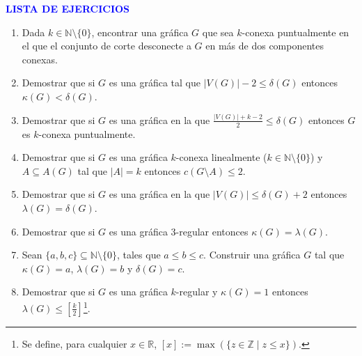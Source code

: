 \documentclass[10pt]{report}
\numberwithin{section}{chapter}
\newcommand{\N}{\mathbb N}
\newcommand{\Z}{\mathbb Z}
\newcommand{\R}{\mathbb R}
\begin{document}
\vspace{1cm}


\begin{center}
\textcolor{blue}{\textbf{\large LISTA DE EJERCICIOS}}
\end{center}


\begin{enumerate}
\item Dada $k \in \N \setminus \{0\}$, encontrar una gráfica $G$ que sea $k$-conexa puntualmente en el que el conjunto de corte desconecte a $G$ en más de dos componentes conexas.

\item Demostrar que si $G$ es una gráfica tal que $|V(G)|-2 \leq \delta(G)$ entonces $\kappa(G) < \delta(G)$.

\item Demostrar que si $G$ es una gráfica en la que $\frac{|V(G)|+k-2}{2} \leq \delta(G)$ entonces $G$ es $k$-conexa puntualmente.


\item Demostrar que si $G$ es una gráfica $k$-conexa linealmente ($k \in \N \setminus \{0\}$) y $A \subseteq A(G)$ tal que $|A| =k$ entonces $c(G\setminus A) \leq 2$.


\item Demostrar que si $G$ es una gráfica en la que $|V(G)| \leq \delta(G)+2$ entonces $\lambda(G) = \delta(G)$.


\item Demostrar que si $G$ es una gráfica $3$-regular entonces $\kappa(G) = \lambda(G)$.

\item Sean $\{a,b,c\} \subseteq \N \setminus \{0\}$, tales que $a \leq b \leq c$. Construir una gráfica $G$ tal que $\kappa(G) =a$, $\lambda (G) = b$ y $\delta(G) =c$.


\item Demostrar que si $G$ es una gráfica $k$-regular y $\kappa(G)=1$ entonces $\lambda(G) \leq \left[ \frac{k}{2}\right]$\footnote{Se define, para cualquier $x \in \R$, $[x] := \max(\{z \in \Z \; | \; z \leq x\})$.}.


\end{enumerate}
\end{document}
